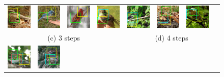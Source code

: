 \documentclass[10pt,twocolumn,letterpaper]{article}
\begin{document}
\begin{figure}[t]
\begin{tabular}{c c c c c c c c}
    \includegraphics[height=0.11\linewidth]{figs/exp/img/3/82_20.jpg} &
    \includegraphics[height=0.11\linewidth]{figs/exp/img/3/537_20.jpg} &
    \includegraphics[height=0.11\linewidth]{figs/exp/img/3/577_20.jpg} & \hspace{10pt}
    \includegraphics[height=0.11\linewidth]{figs/exp/img/4/297_20.jpg} &
    \includegraphics[height=0.11\linewidth]{figs/exp/img/4/1406_20.jpg} &
    \includegraphics[height=0.11\linewidth]{figs/exp/img/4/1656_20.jpg} &
    \includegraphics[height=0.11\linewidth]{figs/exp/img/4/3697_20.jpg} \\
    \multicolumn{4}{c}{(c) 3 steps}  & \multicolumn{4}{c}{(d) 4 steps} \\
    \includegraphics[height=0.11\linewidth]{figs/exp/img/5/362.jpg} &
    \includegraphics[height=0.11\linewidth]{figs/exp/img/5/447.jpg} &

\end{tabular}
\end{figure}
\end{document}
